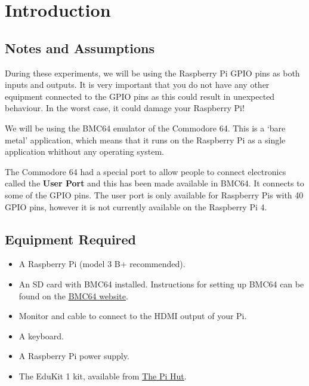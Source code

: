 \section{Introduction}\label{s:intro}


\subsection*{Notes and Assumptions}

During these experiments, we will be using the Raspberry Pi GPIO pins as both inputs and outputs.  It is very important that you do not have any other equipment connected to the GPIO pins as this could result in unexpected behaviour.  In the worst case, it could damage your Raspberry Pi!

We will be using the BMC64 emulator of the Commodore 64.  This is a `bare metal' application, which means that it runs on the Raspberry Pi as a single application whithout any operating system.

The Commodore 64 had a special port to allow people to connect electronics called the \textbf{User Port} and this has been made available in BMC64.  It connects to some of the GPIO pins.  The user port is only available for Raspberry Pis with 40 GPIO pins, however it is not currently available on the Raspberry Pi 4.

\subsection*{Equipment Required}

\begin{itemize}
\item A Raspberry Pi (model 3 B+ recommended).
\item An SD card with BMC64 installed.  Instructions for setting up BMC64 can be found on the \href{https://accentual.com/bmc64/}{BMC64 website}.
\item Monitor and cable to connect to the HDMI output of your Pi.
\item A keyboard.
\item A Raspberry Pi power supply.
\item The EduKit 1 kit, available from \href{https://thepihut.com/edukit}{The Pi Hut}.
\end{itemize}

